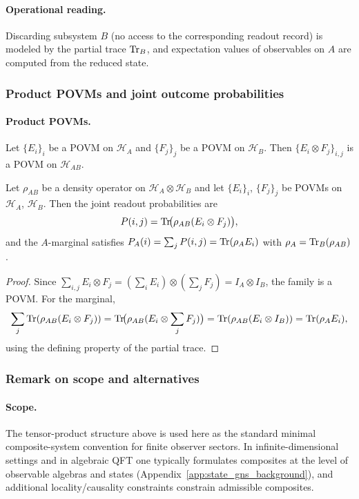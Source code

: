 \paragraph{Operational reading.}
\InterfaceTag Discarding subsystem $B$ (no access to the corresponding readout record) is modeled by the partial trace $\mathrm{Tr}_B$, and expectation values of observables on $A$ are computed from the reduced state.

\subsubsection{Product POVMs and joint outcome probabilities}
\paragraph{Product POVMs.}
Let $\{E_i\}_i$ be a POVM on $\mathcal{H}_A$ and $\{F_j\}_j$ be a POVM on $\mathcal{H}_B$.
Then $\{E_i\otimes F_j\}_{i,j}$ is a POVM on $\mathcal{H}_{AB}$.

\begin{lemma}
\label{lem:born_joint_product_povm}
Let $\rho_{AB}$ be a density operator on $\mathcal{H}_A\otimes\mathcal{H}_B$ and let $\{E_i\}_i$, $\{F_j\}_j$ be POVMs on $\mathcal{H}_A$, $\mathcal{H}_B$.
Then the joint readout probabilities are
\[
P(i,j)=\mathrm{Tr}\!\bigl(\rho_{AB}(E_i\otimes F_j)\bigr),
\]
and the $A$-marginal satisfies $P_A(i)=\sum_j P(i,j)=\mathrm{Tr}(\rho_A E_i)$ with $\rho_A=\mathrm{Tr}_B(\rho_{AB})$.
\end{lemma}
\begin{proof}
Since $\sum_{i,j}E_i\otimes F_j=(\sum_i E_i)\otimes(\sum_j F_j)=I_A\otimes I_B$, the family is a POVM.
For the marginal,
\[
\sum_j \mathrm{Tr}(\rho_{AB}(E_i\otimes F_j))
=\mathrm{Tr}\!\bigl(\rho_{AB}(E_i\otimes \sum_j F_j)\bigr)
=\mathrm{Tr}(\rho_{AB}(E_i\otimes I_B))
=\mathrm{Tr}(\rho_A E_i),
\]
using the defining property of the partial trace.
\end{proof}

\subsubsection{Remark on scope and alternatives}
\paragraph{Scope.}
\AuditTag The tensor-product structure above is used here as the standard minimal composite-system convention for finite observer sectors.
In infinite-dimensional settings and in algebraic QFT one typically formulates composites at the level of observable algebras and states (Appendix~\ref{app:state_gns_background}), and additional locality/causality constraints constrain admissible composites.

